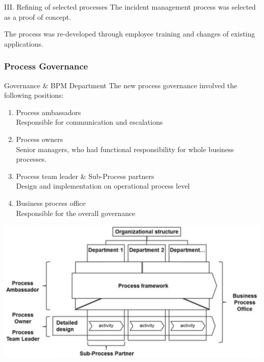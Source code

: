 \documentclass{beamer}
\begin{document}
\begin{frame}{III. Refining of selected processes}
    The incident management process was selected as a proof of concept.

    \vspace{1em}

    The process was re-developed through employee training and changes of existing applications.
\end{frame}

\subsubsection{Process Governance}
\begin{frame}{Governance \& BPM Department}
    The new process governance involved the following positions:
    \begin{enumerate}
        \item Process ambassadors\\Responsible for communication and escalations
        \item Process owners\\Senior managers, who had functional responsibility for whole business processes.
        \item Process team leader \& Sub-Process partners\\Design and implementation on operational process level
        \item Business process office\\Responsible for the overall governance
    \end{enumerate}
\end{frame}

\begin{frame}
    \begin{center}
        \includegraphics[width=1.0\textwidth]{proj_bpmDepartment.png}
    \end{center}
\end{frame}
\end{document}
